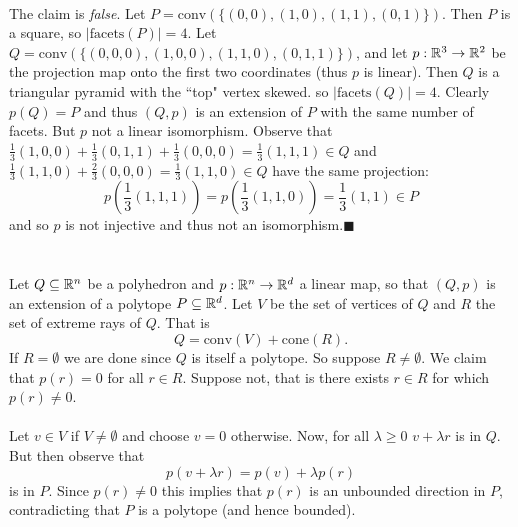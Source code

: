 \documentclass[letterpaper,12pt,oneside,onecolumn]{article}
\newcommand{\conv}[1]{\ensuremath{\text{conv}(#1) }}
\newcommand{\cone}[1]{\ensuremath{\text{cone}(#1) }}
\begin{document}
\paragraph{}
The claim is \emph{false}. Let $P = \conv{\{(0,0),(1,0),(1,1),(0,1)\}}$. Then $P$ is a square, so $|\text{facets}(P)| = 4$. Let $Q = \conv{\{(0,0,0),(1,0,0), (1,1,0), (0,1,1)\}}$, and let $p: \mathbb{R}^3\rightarrow \mathbb{R}^2$ be the projection map onto the first two coordinates (thus $p$ is linear). Then $Q$ is a triangular pyramid with the ``top" vertex skewed. so $|\text{facets}(Q)| = 4$. Clearly $p(Q) = P$ and thus $(Q,p)$ is an extension of $P$ with the same number of facets. But $p$ not a linear isomorphism. Observe that $\frac{1}{3}(1,0,0) + \frac{1}{3}(0,1,1) + \frac{1}{3}(0,0,0) = \frac{1}{3}(1,1,1) \in Q$ and $ \frac{1}{3}(1,1,0) + \frac{2}{3}(0,0,0) = \frac{1}{3}(1,1,0) \in Q$ have the same projection:
$$p(\frac{1}{3}(1,1,1)) = p(\frac{1}{3}(1,1,0)) = \frac{1}{3}(1,1) \in P$$
and so $p$ is not injective and thus not an isomorphism.$\blacksquare$
\section{}
\paragraph{}
Let $Q \subseteq \mathbb{R}^n$ be a polyhedron and $p:\mathbb{R}^n \rightarrow \mathbb{R}^d$ a linear map, so that $(Q,p)$ is an extension of a polytope $P \subseteq \mathbb{R}^d$. Let $V$ be the set of vertices of $Q$ and $R$ the set of extreme rays of $Q$. That is
$$ Q = \conv{V} + \cone{R}.$$
If $R = \emptyset$ we are done since $Q$ is itself a polytope. So suppose $R\neq \emptyset$. We claim that $p(r) = 0$ for all $r \in R$. Suppose not, that is there exists $r \in R$ for which $p(r) \neq 0$. 
\paragraph{}
Let $v \in V$ if $V\neq \emptyset$ and choose $v = 0$ otherwise. Now, for all $\lambda \geq 0$ $v + \lambda r$ is in $Q$. But then observe that
$$p(v + \lambda r) = p(v) + \lambda p(r)$$
is in $P$. Since $p(r) \neq 0$ this implies that $p(r)$ is an unbounded direction in $P$, contradicting that $P$ is a polytope (and hence bounded). 
\section{}
\paragraph{}

\section{}
\paragraph{}

\section{}
\paragraph{}
\end{document}

